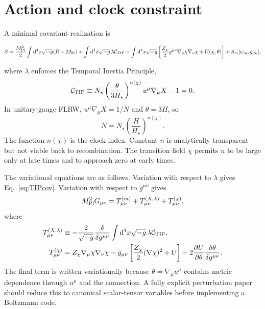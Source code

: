 \documentclass[aps,prd,reprint,nofootinbib,superscriptaddress,longbibliography]{revtex4-2}
\newcommand{\dd}{\mathrm{d}}
\newcommand{\mpl}{M_{\rm Pl}}
\newcommand{\gt}{\tilde g}
\newcommand{\cTIP}{{\cal C}_{\rm TIP}}
\begin{document}
\section{Action and clock constraint}

A minimal covariant realization is
\begin{widetext}
\begin{equation}
  S=\frac{\mpl^2}{2}\int \dd^4x\sqrt{-g}(R-2\Lambda_{\rm E})
  +\int \dd^4x\sqrt{-g}\,\lambda\cTIP
  -\int \dd^4x\sqrt{-g}\left[\frac{Z_\chi}{2}g^{\mu\nu}\nabla_\mu\chi\nabla_\nu\chi+U(\chi,\theta)\right]
  +S_m[\psi_m,\gt_{\mu\nu}],
  \label{eq:action}
\end{equation}
\end{widetext}
where $\lambda$ enforces the Temporal Inertia Principle,
\begin{equation}
  \cTIP\equiv N_\star\left(\frac{\theta}{3H_\star}\right)^{n(\chi)}u^\mu\nabla_\mu X-1=0 .
  \label{eq:TIPcov}
\end{equation}
In unitary-gauge FLRW, $u^\mu\nabla_\mu X=1/N$ and $\theta=3H$, so
\begin{equation}
  N=N_\star\left(\frac{H}{H_\star}\right)^{n(\chi)} .
  \label{eq:TIPlapse}
\end{equation}
The function $n(\chi)$ is the clock index.  Constant $n$ is analytically transparent but not viable back to recombination.  The transition field $\chi$ permits $n$ to be large only at late times and to approach zero at early times.

The variational equations are as follows.  Variation with respect to $\lambda$ gives Eq.~\eqref{eq:TIPcov}.  Variation with respect to $g^{\mu\nu}$ gives
\begin{equation}
  \mpl^2 G_{\mu\nu}=T^{(m)}_{\mu\nu}+T^{(X,\lambda)}_{\mu\nu}+T^{(\chi)}_{\mu\nu},
  \label{eq:Einstein}
\end{equation}
where
\begin{align}
  T^{(X,\lambda)}_{\mu\nu}&\equiv -\frac{2}{\sqrt{-g}}\frac{\delta}{\delta g^{\mu\nu}}
  \int \dd^4x\sqrt{-g}\,\lambda\cTIP,\\
  T^{(\chi)}_{\mu\nu}&=Z_\chi\nabla_\mu\chi\nabla_\nu\chi
  -g_{\mu\nu}\left[\frac{Z_\chi}{2}(\nabla\chi)^2+U\right]
  -2\frac{\partial U}{\partial\theta}\frac{\delta\theta}{\delta g^{\mu\nu}} .
\end{align}
The final term is written variationally because $\theta=\nabla_\mu u^\mu$ contains metric dependence through $u^\mu$ and the connection.  A fully explicit perturbation paper should reduce this to canonical scalar-tensor variables before implementing a Boltzmann code.
\end{document}
